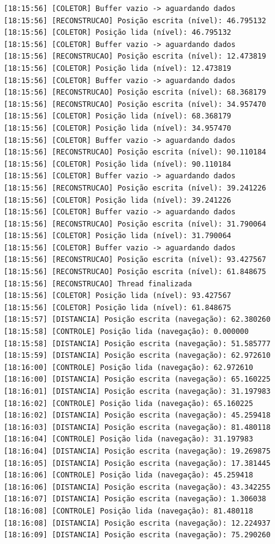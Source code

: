 \documentclass[12pt]{article}
\begin{document}
\begin{verbatim}
[18:15:56] [COLETOR] Buffer vazio -> aguardando dados
[18:15:56] [RECONSTRUCAO] Posição escrita (nível): 46.795132
[18:15:56] [COLETOR] Posição lida (nível): 46.795132
[18:15:56] [COLETOR] Buffer vazio -> aguardando dados
[18:15:56] [RECONSTRUCAO] Posição escrita (nível): 12.473819
[18:15:56] [COLETOR] Posição lida (nível): 12.473819
[18:15:56] [COLETOR] Buffer vazio -> aguardando dados
[18:15:56] [RECONSTRUCAO] Posição escrita (nível): 68.368179
[18:15:56] [RECONSTRUCAO] Posição escrita (nível): 34.957470
[18:15:56] [COLETOR] Posição lida (nível): 68.368179
[18:15:56] [COLETOR] Posição lida (nível): 34.957470
[18:15:56] [COLETOR] Buffer vazio -> aguardando dados
[18:15:56] [RECONSTRUCAO] Posição escrita (nível): 90.110184
[18:15:56] [COLETOR] Posição lida (nível): 90.110184
[18:15:56] [COLETOR] Buffer vazio -> aguardando dados
[18:15:56] [RECONSTRUCAO] Posição escrita (nível): 39.241226
[18:15:56] [COLETOR] Posição lida (nível): 39.241226
[18:15:56] [COLETOR] Buffer vazio -> aguardando dados
[18:15:56] [RECONSTRUCAO] Posição escrita (nível): 31.790064
[18:15:56] [COLETOR] Posição lida (nível): 31.790064
[18:15:56] [COLETOR] Buffer vazio -> aguardando dados
[18:15:56] [RECONSTRUCAO] Posição escrita (nível): 93.427567
[18:15:56] [RECONSTRUCAO] Posição escrita (nível): 61.848675
[18:15:56] [RECONSTRUCAO] Thread finalizada
[18:15:56] [COLETOR] Posição lida (nível): 93.427567
[18:15:56] [COLETOR] Posição lida (nível): 61.848675
[18:15:57] [DISTANCIA] Posição escrita (navegação): 62.380260
[18:15:58] [CONTROLE] Posição lida (navegação): 0.000000
[18:15:58] [DISTANCIA] Posição escrita (navegação): 51.585777
[18:15:59] [DISTANCIA] Posição escrita (navegação): 62.972610
[18:16:00] [CONTROLE] Posição lida (navegação): 62.972610
[18:16:00] [DISTANCIA] Posição escrita (navegação): 65.160225
[18:16:01] [DISTANCIA] Posição escrita (navegação): 31.197983
[18:16:02] [CONTROLE] Posição lida (navegação): 65.160225
[18:16:02] [DISTANCIA] Posição escrita (navegação): 45.259418
[18:16:03] [DISTANCIA] Posição escrita (navegação): 81.480118
[18:16:04] [CONTROLE] Posição lida (navegação): 31.197983
[18:16:04] [DISTANCIA] Posição escrita (navegação): 19.269875
[18:16:05] [DISTANCIA] Posição escrita (navegação): 17.381445
[18:16:06] [CONTROLE] Posição lida (navegação): 45.259418
[18:16:06] [DISTANCIA] Posição escrita (navegação): 43.342255
[18:16:07] [DISTANCIA] Posição escrita (navegação): 1.306038
[18:16:08] [CONTROLE] Posição lida (navegação): 81.480118
[18:16:08] [DISTANCIA] Posição escrita (navegação): 12.224937
[18:16:09] [DISTANCIA] Posição escrita (navegação): 75.290260

\end{verbatim}
\end{document}
